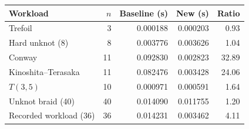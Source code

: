 \begin{center}
\small
\begin{tabular}{lrrrr}
\toprule
Workload & $n$ & Baseline (s) & New (s) & Ratio \\
\midrule
Trefoil & 3 & 0.000188 & 0.000203 & 0.93 \\
Hard unknot (8) & 8 & 0.003776 & 0.003626 & 1.04 \\
Conway & 11 & 0.092830 & 0.002823 & 32.89 \\
Kinoshita--Terasaka & 11 & 0.082476 & 0.003428 & 24.06 \\
$T(3,5)$ & 10 & 0.000971 & 0.000591 & 1.64 \\
Unknot braid (40) & 40 & 0.014090 & 0.011755 & 1.20 \\
Recorded workload (36) & 36 & 0.014231 & 0.003462 & 4.11 \\
\bottomrule
\end{tabular}
\end{center}
